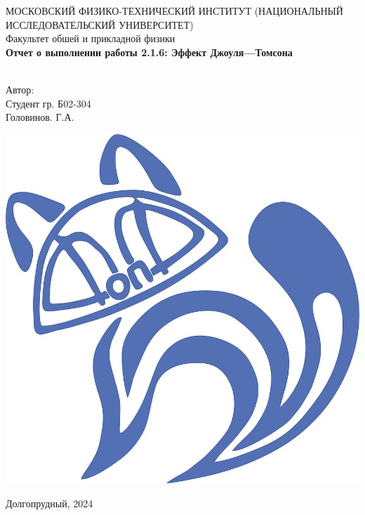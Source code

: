 \begin{titlepage}
	\begin{center}
		МОСКОВСКИЙ ФИЗИКО-ТЕХНИЧЕСКИЙ ИНСТИТУТ (НАЦИОНАЛЬНЫЙ ИССЛЕДОВАТЕЛЬСКИЙ УНИВЕРСИТЕТ) \\
		
		
		\hfill \break
		Факультет обшей и прикладной физики\\
		\vspace{2.5cm}
		\large{\textbf{Отчет о выполнении работы 2.1.6: Эффект Джоуля---Томсона}}\\
		\hfill \break
		\\
	\end{center}
	
	\begin{flushright}
		Автор:\\
		Студент гр. Б02-304\\
		Головинов. Г.А.
	\end{flushright}
	
	\vfill
	
	\begin{center}
		\includegraphics[width=0.15\linewidth]{uni}
	\end{center}
	
	\begin{center} Долгопрудный, 2024 \end{center}
	
	\thispagestyle{empty}
	
\end{titlepage}